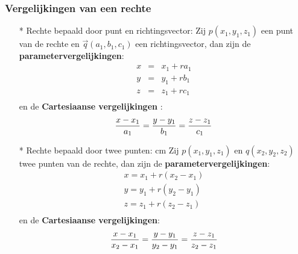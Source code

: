 \subsubsection{Vergelijkingen van een rechte} \label{vergelijking_rechte}
\hypertarget{vergelijking_rechte}{}
\begin{itemize}
\item[*] Rechte bepaald door punt en richtingsvector:\vskip 0.5cm
Zij $p(x_1, y_1, z_1)$ een punt van de rechte en $\vec{q}(a_1, b_1, c_1)$ een richtingsvector, dan zijn de {\bf parametervergelijkingen}:
\begin{eqnarray*}
x & = & x_1 +ra_1 \\
y & = & y_1 +rb_1 \\
z & = & z_1 +rc_1 \\
\end{eqnarray*}
en de {\bf Cartesiaanse vergelijkingen }: 
\[\displaystyle\frac{\displaystyle x-x_1}{\displaystyle a_1}=\frac{\displaystyle y-y_1}{\displaystyle b_1}=\frac{\displaystyle z-z_1}{\displaystyle c_1}\]\vskip 0.5cm
\item[*] Rechte bepaald door twee punten: cm
Zij $p(x_1, y_1, z_1)$ en $q(x_2, y_2, z_2)$ twee punten van de rechte, dan zijn de {\bf parametervergelijkingen}:
\begin{eqnarray*}
x=x_1+r(x_2-x_1)\\
y=y_1+r(y_2-y_1)\\
z=z_1+r(z_2-z_1)\\
\end{eqnarray*}
en de {\bf Cartesiaanse vergelijkingen}: 
\[\displaystyle\frac{\displaystyle x-x_1}{\displaystyle x_2-x_1}=\frac{\displaystyle y-y_1}{\displaystyle y_2-y_1}=\frac{\displaystyle z-z_1}{\displaystyle z_2-z_1}\]
\end{itemize}

